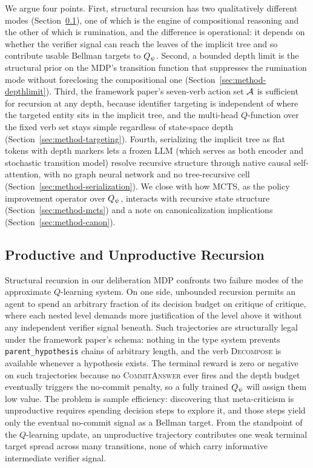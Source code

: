 We argue four points. First, structural recursion has two qualitatively
different modes (Section~\ref{sec:method-productive}), one of which is
the engine of compositional reasoning and the other of which is
rumination, and the difference is operational: it depends on whether the
verifier signal can reach the leaves of the implicit tree and so
contribute usable Bellman targets to $Q_{\psi}$. Second, a bounded depth
limit is the structural prior on the MDP's transition function that
suppresses the rumination mode without foreclosing the compositional one
(Section~\ref{sec:method-depthlimit}). Third, the framework paper's
seven-verb action set $\mathcal{A}$ is sufficient for recursion at any depth,
because identifier targeting is independent of where the targeted entity
sits in the implicit tree, and the multi-head $Q$-function over the
fixed verb set stays simple regardless of state-space depth
(Section~\ref{sec:method-targeting}). Fourth, serializing the implicit
tree as flat tokens with depth markers lets a frozen LLM (which serves
as both encoder and stochastic transition model) resolve recursive
structure through native causal self-attention, with no graph neural
network and no tree-recursive cell
(Section~\ref{sec:method-serialization}). We close with how MCTS, as the
policy improvement operator over $Q_{\psi}$, interacts with recursive
state structure (Section~\ref{sec:method-mcts}) and a note on
canonicalization implications (Section~\ref{sec:method-canon}).

\subsection{Productive and Unproductive Recursion}
\label{sec:method-productive}

Structural recursion in our deliberation MDP confronts two failure modes
of the approximate $Q$-learning system. On one side, unbounded recursion
permits an agent to spend an arbitrary fraction of its decision budget
on critique of critique, where each nested level demands more
justification of the level above it without any independent verifier
signal beneath. Such trajectories are structurally legal under the
framework paper's schema: nothing in the type system prevents
\texttt{parent\_hypothesis} chains of arbitrary length, and the verb
\textsc{Decompose} is available whenever a hypothesis exists. The
terminal reward is zero or negative on such trajectories because no
\textsc{CommitAnswer} ever fires and the depth budget eventually
triggers the no-commit penalty, so a fully trained $Q_{\psi}$ will assign
them low value. The problem is sample efficiency: discovering that
meta-criticism is unproductive requires spending decision steps to
explore it, and those steps yield only the eventual no-commit signal as
a Bellman target. From the standpoint of the $Q$-learning update, an
unproductive trajectory contributes one weak terminal target spread
across many transitions, none of which carry informative intermediate
verifier signal.

